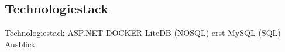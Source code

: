 \subsection{Technologiestack} \label{subsec:Technologiestack}
Technologiestack
    ASP.NET
    DOCKER
    LiteDB (NOSQL) erst
    MySQL (SQL) Ausblick
